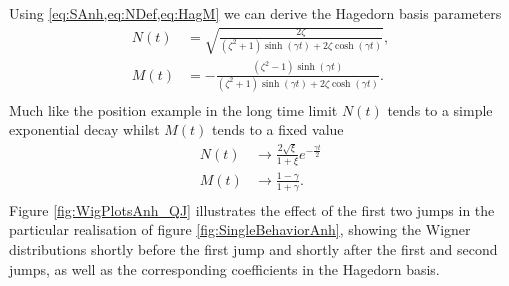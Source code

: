 \documentclass[12pt]{iopart} %
\begin{document}
Using \cref{eq:SAnh,eq:NDef,eq:HagM} we can derive the Hagedorn basis parameters 
\begin{equation}
\begin{aligned}
   N(t)&=\sqrt{\frac{2 \zeta}{\left(\zeta ^2+1\right) \sinh \left(\gamma  t\right)+2 \zeta \cosh \left(\gamma  t\right)}},\\
   M(t)&=-\frac{\left(\zeta ^2-1\right) \sinh (\gamma  t)}{\left(\zeta ^2+1\right) \sinh (\gamma  t)+2 \zeta  \cosh (\gamma  t)}.\\
\end{aligned}
\end{equation}
Much like the position example in the long time limit $N(t)$ tends to a simple exponential decay whilst $M(t)$ tends to a fixed value
\begin{equation}
\begin{aligned}
    N(t)&\to\frac{2 \sqrt{\xi}}{1+\xi}e^{-\frac{\gamma t}{2}}\\
    M(t)&\to\frac{1-\gamma}{1+\gamma}.\\
\end{aligned}
\end{equation}
Figure \ref{fig:WigPlotsAnh_QJ} illustrates the effect of the first two jumps in the particular realisation of figure \ref{fig:SingleBehaviorAnh}, showing the Wigner distributions shortly before the first jump and shortly after the first and second jumps, as well as the corresponding coefficients in the Hagedorn basis. 
\end{document}
